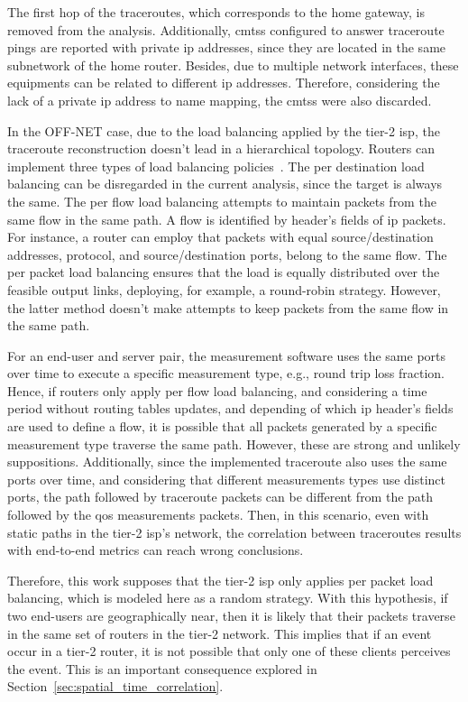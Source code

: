 The first hop of the traceroutes, which corresponds to the home gateway, is
removed from the analysis.
Additionally, \glspl*{cmts} configured to answer traceroute pings are reported
with private \gls*{ip} addresses,
since they are located in the same subnetwork of the home router.
Besides, due to multiple network interfaces, these equipments can be related
to different \gls*{ip} addresses.
Therefore, considering the lack of a private \gls*{ip} address to name mapping,
the \glspl*{cmts} were also discarded.

In the OFF-NET case, due to the load balancing applied by the tier-2 \gls*{isp},
the traceroute reconstruction doesn't lead in a hierarchical topology.
Routers can implement three types of load balancing
policies~\cite{avoiding_traceroute_anomalies_with_paris_traceroute}.
The per
destination load balancing can be disregarded in the current analysis, since
the target is always the same. The per flow load balancing attempts to
maintain packets from the same flow in the same path. A flow is identified
by header's fields of \gls*{ip} packets. For instance, a
router can employ that packets with equal source/destination
addresses, protocol, and source/destination ports,
belong to the same flow. The per packet load
balancing ensures that the load is equally distributed over the feasible output
links, deploying, for example, a round-robin strategy. However, the latter
method doesn't
make attempts to keep packets from the same flow in the same path.

For an end-user and server pair,
the measurement software uses the same ports over time to execute a specific
measurement type, e.g., round trip loss fraction.
Hence, if routers only apply per flow load balancing,
and considering a time period without routing tables updates, and
depending of which \gls*{ip} header's fields are used to define a flow, it is possible
that all packets generated by a specific measurement type traverse the same
path. However, these are strong and unlikely suppositions.
Additionally, since the implemented traceroute also uses the same ports over
time, and considering that different measurements types use distinct ports,
the
path followed by traceroute packets can be different from the path followed by
the \gls*{qos} measurements packets. Then, in this scenario, even with static paths in
the tier-2 \gls*{isp}'s network, the correlation between traceroutes
results with end-to-end metrics can reach wrong conclusions.

Therefore, this work supposes that the tier-2 \gls*{isp} only applies per packet load
balancing, which is modeled here as a random strategy. With this hypothesis,
if two end-users are geographically near, then it is likely that their packets
traverse in the same set of routers in the tier-2 network. This implies that if
an event occur in a tier-2 router, it is not possible that only one of these
clients perceives the event. This is an important consequence explored in
Section~\ref{sec:spatial_time_correlation}.

